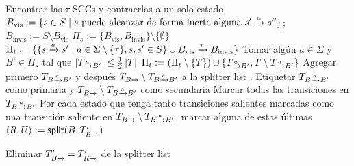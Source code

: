 \begin{algorithm}[!t]
	\caption{Pseudocódigo del algoritmo para las particiones de branching bisimulation.\label{algo:main-algorithm-abstract}}
	\parbox{0.79\textwidth}{
	\small\begin{algorithmic}[1]
	\STATE	Encontrar las $\tau$-SCCs y contraerlas a un solo estado
		\label{alg-line-contract-SCCs}
	\STATE $B_\text{vis} := \{ s \in S \mid s \text{ puede alcanzar de forma inerte alguna } s' \pijl{a} s'' \}$;
	\label{alg-line-initialize-partitions-begin} \quad
		$B_\text{invis} := S \setminus B_\text{vis}$
	\STATE	$\Pi_s := \{ B_\text{vis}, B_\text{invis} \} \setminus \{ \emptyset \}$
		\label{alg-line-initialize-Pi_s-end}
	\STATE	$\Pi_t := \{ \{ s \pijl{a} s' \mid a \in \Sigma \setminus \{\tau\}, s,s' \in S \} \cup B_\text{vis} \pijl{\tau} B_\text{invis} \}$
		\label{alg-line-initialize-partitions-end}
	 \label{algo:main:outerloop}
		\STATE	Tomar algún $a \in \Sigma$ y $B' \in \Pi_s$ tal que $\size{\TaB} \leq \frac{1}{2}\size{T}$
			\label{alg-line-select-small-bunch}
		\STATE	$\Pi_t := (\Pi_t \setminus \{ T \}) \cup \{ \TaB, T \setminus \TaB \}$\label{alg:split_transitions}
			\STATE	Agregar primero $\TBaB$ y después $\TB \setminus \TBaB$ a la splitter list%
				\label{alg-line-find-splittable-block}. Etiquetar $\TBaB$ como primaria y $\TB \setminus \TBaB$ como secundaria%
					\STATE  Marcar todas las transiciones en $\TBaB$\label{alg-line-mark-all-transitions-in-primary}
			\STATE	Por cada estado que tenga tanto transiciones salientes marcadas como una transición saliente en $\TB \setminus \TBaB$, marcar alguna de estas últimas
				\label{alg-line-mark-one-transition-in-secondary-splitter}
		\ENDFOR\label{alg-line-markloop-end}
			\STATE	\label{alg:line:callsplit1}%
				$\langle R, U \rangle := \mathsf{split}(B, \TB')$%
			\item[]	\mbox{}%
			\STATE  Eliminar $\TB' = T'_{R \pijl{}}$ de la splitter list\label{alg:removeTBpijl}

\end{algorithmic}}
\end{algorithm}
